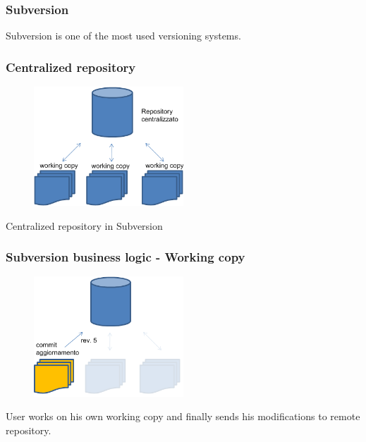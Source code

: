 \documentclass[10pt]{beamer}
\begin{document}
\begin{frame}[fragile]
 \frametitle{Subversion}
Subversion is one of the most used versioning systems.
\end{frame}

\begin{frame}[fragile]
\frametitle{Centralized repository}
\begin{figure}[h]
 \centering
 \includegraphics[width=0.5\textwidth]{images/svn-schema.png}
\end{figure}
Centralized repository in Subversion
\end{frame}
\begin{frame}[fragile]
\frametitle{Subversion business logic - Working copy}
\begin{figure}[h]
 \centering
 \includegraphics[width=0.5\textwidth]{images/svn-step2.png}
\end{figure}
User works on his own working copy and finally sends his modifications to remote repository.
\end{frame}
\end{document}
